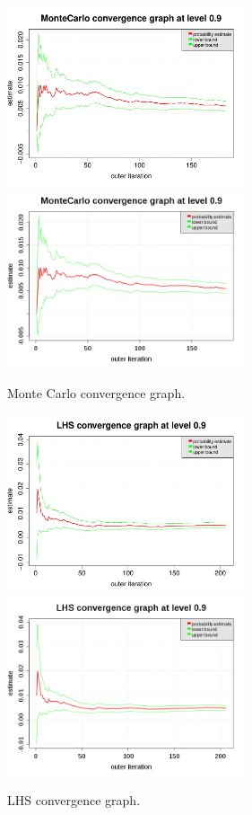 \documentclass[11pt]{article}
\begin{document}
\begin{figure}[Hhbtp]
  \begin{minipage}{9.8cm}
    \begin{center}
      \ifpdf
      \includegraphics[width=7cm]{convergenceGrapheMonteCarlo.pdf}
      \else
      \includegraphics[width=7cm]{convergenceGrapheMonteCarlo.png}
      \fi
      \caption{Monte Carlo convergence graph.}
      \label{MCConvergence}
    \end{center}
  \end{minipage}
  \hfill
  \begin{minipage}{9.8cm}
    \begin{center}
      \ifpdf
      \includegraphics[width=7cm]{convergenceGrapheLHS.pdf}
      \else
      \includegraphics[width=7cm]{convergenceGrapheLHS.png}
      \fi
      \caption{LHS convergence graph.}
      \label{LHSConvergence}
    \end{center}
  \end{minipage}
\end{figure}
\end{document}
